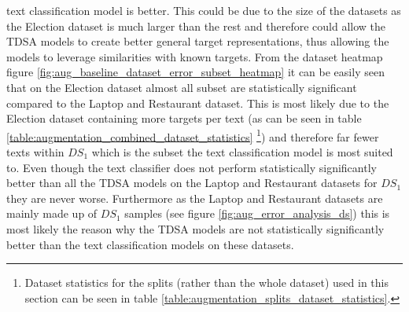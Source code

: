 text classification model is better. This could be due to the size of the datasets as the Election dataset is much larger than the rest and therefore could allow the TDSA models to create better general target representations, thus allowing the models to leverage similarities with known targets. From the dataset heatmap figure \ref{fig:aug_baseline_dataset_error_subset_heatmap} it can be easily seen that on the Election dataset almost all subset are statistically significant compared to the Laptop and Restaurant dataset. This is most likely due to the Election dataset containing more targets per text (as can be seen in table \ref{table:augmentation_combined_dataset_statistics} \footnote{Dataset statistics for the splits (rather than the whole dataset) used in this section can be seen in table \ref{table:augmentation_splits_dataset_statistics}.}) and therefore far fewer texts within $DS_1$ which is the subset the text classification model is most suited to. Even though the text classifier does not perform  statistically significantly better than all the TDSA models on the Laptop and Restaurant datasets for $DS_1$ they are never worse. Furthermore as the Laptop and Restaurant datasets are mainly made up of $DS_1$ samples (see figure \ref{fig:aug_error_analysis_ds}) this is most likely the reason why the TDSA models are not statistically significantly better than the text classification models on these datasets.

\afterpage{%
    \thispagestyle{document}
    \begin{landscape}%
            \centering
            
    \end{landscape}
    \clearpage%
}

